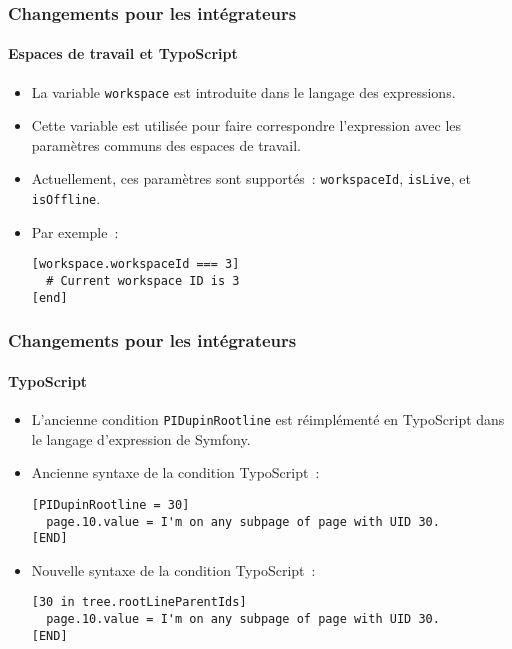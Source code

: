 \begin{frame}[fragile]
	\frametitle{Changements pour les intégrateurs}
	\framesubtitle{Espaces de travail et TypoScript}

	\lstset{basicstyle=\smaller\ttfamily}

	\begin{itemize}
		\item La variable \texttt{workspace} est introduite dans le langage des expressions.
		\item Cette variable est utilisée pour faire correspondre l'expression avec les
			paramètres communs des espaces de travail.
		\item Actuellement, ces paramètres sont supportés~:\newline
			\small
				\texttt{workspaceId}, \texttt{isLive}, et \texttt{isOffline}.
			\normalsize
		\item Par exemple~:

\vspace{-0.4cm}
\begin{lstlisting}
[workspace.workspaceId === 3]
  # Current workspace ID is 3
[end]
\end{lstlisting}

	\end{itemize}

\end{frame}


\begin{frame}[fragile]
	\frametitle{Changements pour les intégrateurs}
	\framesubtitle{TypoScript}

	\lstset{basicstyle=\smaller\ttfamily}

	\begin{itemize}
		\item L'ancienne condition \texttt{PIDupinRootline} est réimplémenté
			en TypoScript dans le langage d'expression de Symfony.
		\item Ancienne syntaxe de la condition TypoScript~:

\vspace{-0.4cm}
\begin{lstlisting}
[PIDupinRootline = 30]
  page.10.value = I'm on any subpage of page with UID 30.
[END]
\end{lstlisting}

		\item Nouvelle syntaxe de la condition TypoScript~:

\vspace{-0.4cm}
\begin{lstlisting}
[30 in tree.rootLineParentIds]
  page.10.value = I'm on any subpage of page with UID 30.
[END]
\end{lstlisting}

	\end{itemize}

\end{frame}

